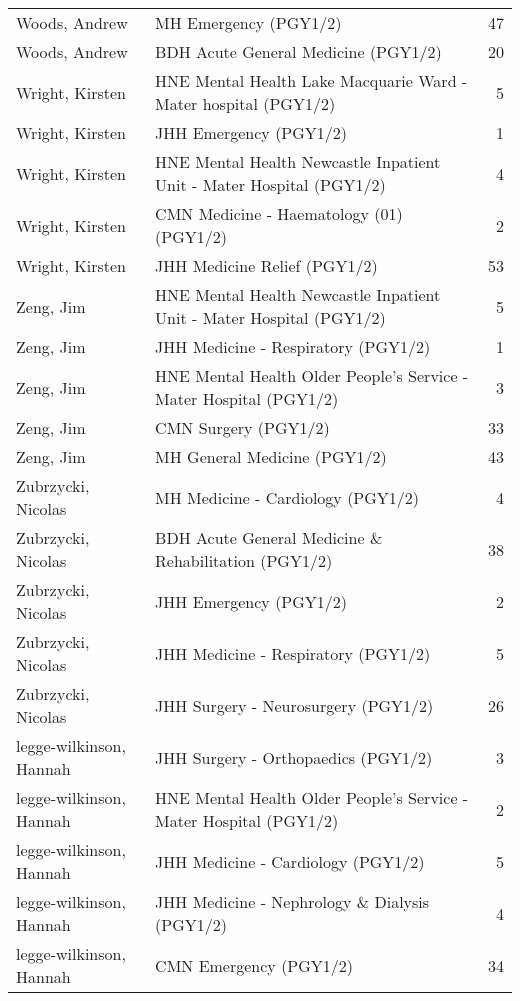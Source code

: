\documentclass[
]{article}
\begin{document}
\begin{longtable}{llr}
Woods, Andrew & MH Emergency (PGY1/2) & 47 \\ 
Woods, Andrew & BDH Acute General Medicine (PGY1/2) & 20 \\ 
Wright, Kirsten & HNE Mental Health Lake Macquarie Ward - Mater hospital (PGY1/2) & 5 \\ 
Wright, Kirsten & JHH Emergency (PGY1/2) & 1 \\ 
Wright, Kirsten & HNE Mental Health Newcastle Inpatient Unit - Mater Hospital (PGY1/2) & 4 \\ 
Wright, Kirsten & CMN Medicine - Haematology (01) (PGY1/2) & 2 \\ 
Wright, Kirsten & JHH Medicine Relief (PGY1/2) & 53 \\ 
Zeng, Jim & HNE Mental Health Newcastle Inpatient Unit - Mater Hospital (PGY1/2) & 5 \\ 
Zeng, Jim & JHH Medicine - Respiratory (PGY1/2) & 1 \\ 
Zeng, Jim & HNE Mental Health Older People's Service - Mater Hospital (PGY1/2) & 3 \\ 
Zeng, Jim & CMN Surgery (PGY1/2) & 33 \\ 
Zeng, Jim & MH General Medicine (PGY1/2) & 43 \\ 
Zubrzycki, Nicolas & MH  Medicine - Cardiology (PGY1/2) & 4 \\ 
Zubrzycki, Nicolas & BDH Acute General Medicine \& Rehabilitation (PGY1/2) & 38 \\ 
Zubrzycki, Nicolas & JHH Emergency (PGY1/2) & 2 \\ 
Zubrzycki, Nicolas & JHH Medicine - Respiratory (PGY1/2) & 5 \\ 
Zubrzycki, Nicolas & JHH Surgery - Neurosurgery (PGY1/2) & 26 \\ 
legge-wilkinson, Hannah & JHH Surgery - Orthopaedics (PGY1/2) & 3 \\ 
legge-wilkinson, Hannah & HNE Mental Health Older People's Service - Mater Hospital (PGY1/2) & 2 \\ 
legge-wilkinson, Hannah & JHH Medicine - Cardiology (PGY1/2) & 5 \\ 
legge-wilkinson, Hannah & JHH Medicine - Nephrology \& Dialysis (PGY1/2) & 4 \\ 
legge-wilkinson, Hannah & CMN Emergency (PGY1/2) & 34 \\ 
\bottomrule
\end{longtable}
\end{document}

